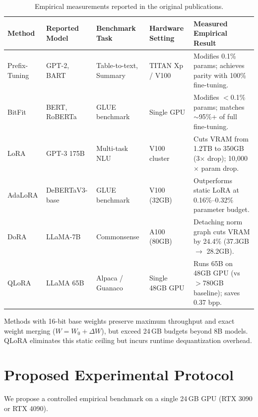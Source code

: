 \documentclass[11pt,a4paper]{article}
\begin{document}
\begin{table}[ht]
\centering
\footnotesize
\caption{Empirical measurements reported in the original publications.}
\label{tab:empirical}
\begin{tabularx}{\textwidth}{l >{\raggedright\arraybackslash}p{2.1cm} >{\raggedright\arraybackslash}p{2.3cm} >{\raggedright\arraybackslash}p{2.2cm} >{\raggedright\arraybackslash}X}
\toprule
\textbf{Method} & \textbf{Reported Model} & \textbf{Benchmark Task} & \textbf{Hardware Setting} & \textbf{Measured Empirical Result} \\
\midrule
Prefix-Tuning \cite{li2021prefix} & GPT-2, BART & Table-to-text, Summary & TITAN Xp / V100 & Modifies 0.1\% params; achieves parity with 100\% fine-tuning. \\
BitFit \cite{zaken2022bitfit} & BERT, RoBERTa & GLUE benchmark & Single GPU & Modifies $<$0.1\% params; matches $\sim$95\%+ of full fine-tuning. \\
LoRA \cite{hu2021lora} & GPT-3 175B & Multi-task NLU & V100 cluster & Cuts VRAM from 1.2TB to 350GB (3$\times$ drop); 10,000$\times$ param drop. \\
AdaLoRA \cite{zhang2023adalora} & DeBERTaV3-base & GLUE benchmark & V100 (32GB) & Outperforms static LoRA at 0.16\%--0.32\% parameter budget. \\
DoRA \cite{liu2024dora} & LLaMA-7B & Commonsense & A100 (80GB) & Detaching norm graph cuts VRAM by 24.4\% (37.3GB $\to$ 28.2GB). \\
QLoRA \cite{dettmers2023qlora} & LLaMA 65B & Alpaca / Guanaco & Single 48GB GPU & Runs 65B on 48GB GPU (vs $>$780GB baseline); saves 0.37 bpp. \\
\bottomrule
\end{tabularx}
\end{table}

Methods with 16-bit base weights preserve maximum throughput and exact weight merging ($W = W_0 + \Delta W$), but exceed 24\,GB budgets beyond 8B models. QLoRA eliminates this static ceiling but incurs runtime dequantization overhead.

\section{Proposed Experimental Protocol}
We propose a controlled empirical benchmark on a single 24\,GB GPU (RTX 3090 or RTX 4090).
\end{document}
